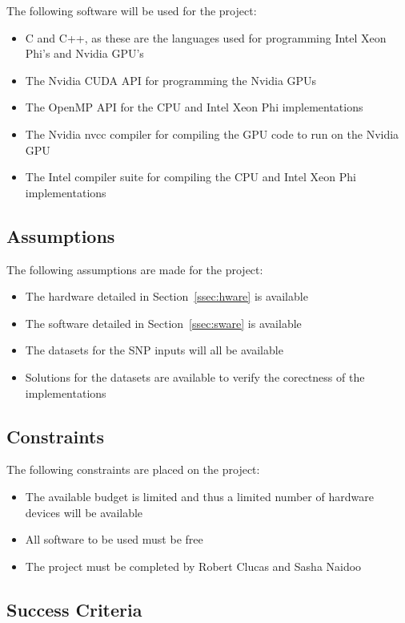 \documentclass[10pt,twocolumn]{article}
\begin{document}
The following software will be used for the project:
\begin{itemize}[noitemsep]
    \item{C and C++, as these are the languages used for programming Intel Xeon Phi's and Nvidia GPU's}
    \item{The Nvidia CUDA API for programming the Nvidia GPUs}
    \item{The OpenMP API for the CPU and Intel Xeon Phi implementations}
    \item{The Nvidia nvcc compiler for compiling the GPU code to run on the Nvidia GPU}
    \item{The Intel compiler suite for compiling the CPU and Intel Xeon Phi implementations}
\end{itemize}

\subsection{Assumptions}

The following assumptions are made for the project:
\begin{itemize}[noitemsep]
    \item{The hardware detailed in Section~\ref{ssec:hware} is available}
    \item{The software detailed in Section~\ref{ssec:sware} is available}
    \item{The datasets for the SNP inputs will all be available}
    \item{Solutions for the datasets are available to verify the corectness of the implementations}
\end{itemize}

\subsection{Constraints}

The following constraints are placed on the project:
\begin{itemize}[noitemsep]
    \item{The available budget is limited and thus a limited number of hardware devices will be available}
    \item{All software to be used must be free}
    \item{The project must be completed by Robert Clucas and Sasha Naidoo}
\end{itemize}

\subsection{Success Criteria}
\end{document}
